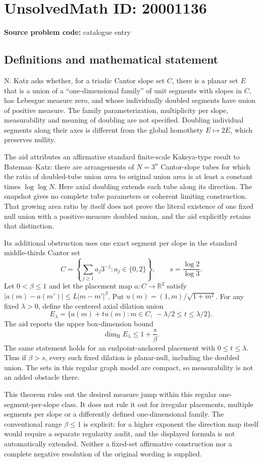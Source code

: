 \documentclass[11pt]{article}
\newcommand{\R}{\mathbb{R}}
\begin{document}
\section*{UnsolvedMath ID: 20001136}
\textbf{Source problem code:} catalogue entry
\subsection{Definitions and mathematical statement}
N. Katz asks whether, for a triadic Cantor slope set $C$, there is a planar set $E$ that is a union of a ``one-dimensional family'' of unit segments with slopes in $C$, has Lebesgue measure zero, and whose individually doubled segments have union of positive measure. The family parameterization, multiplicity per slope, measurability and meaning of doubling are not specified. Doubling individual segments along their axes is different from the global homothety $E\mapsto2E$, which preserves nullity.

The aid attributes an affirmative standard finite-scale Kakeya-type result to Bateman--Katz: there are arrangements of $N=3^n$ Cantor-slope tubes for which the ratio of doubled-tube union area to original union area is at least a constant times $\log\log N$. Here axial doubling extends each tube along its direction. The snapshot gives no complete tube parameters or coherent limiting construction. That growing area ratio by itself does not prove the literal existence of one fixed null union with a positive-measure doubled union, and the aid explicitly retains that distinction.

Its additional obstruction uses one exact segment per slope in the standard middle-thirds Cantor set
\[
 C=\left\{\sum_{j\geq1}a_j3^{-j}:a_j\in\{0,2\}\right\},
 \qquad s=\frac{\log2}{\log3}.
\]
Let $0<\beta\leq1$ and let the placement map $a:C\to\R^2$ satisfy $|a(m)-a(m')|\leq L|m-m'|^\beta$. Put $u(m)=(1,m)/\sqrt{1+m^2}$. For any fixed $\lambda>0$, define the centered axial dilation union
\[
 E_\lambda=\{a(m)+t u(m):m\in C,\ -\lambda/2\leq t\leq\lambda/2\}.
\]
The aid reports the upper box-dimension bound
\[
 \overline{\dim}_{\mathrm B}E_\lambda\leq1+\frac{s}{\beta}.
\]
The same statement holds for an endpoint-anchored placement with $0\leq t\leq\lambda$. Thus if $\beta>s$, every such fixed dilation is planar-null, including the doubled union. The sets in this regular graph model are compact, so measurability is not an added obstacle there.

This theorem rules out the desired measure jump within this regular one-segment-per-slope class. It does not rule it out for irregular placements, multiple segments per slope or a differently defined one-dimensional family. The conventional range $\beta\leq1$ is explicit: for a higher exponent the direction map itself would require a separate regularity audit, and the displayed formula is not automatically extended. Neither a fixed-set affirmative construction nor a complete negative resolution of the original wording is supplied.
\end{document}
